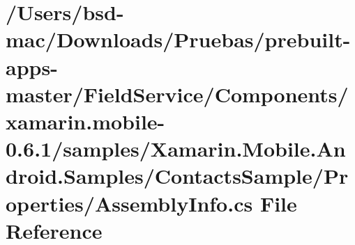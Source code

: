 \hypertarget{_components_2xamarin_8mobile-0_86_81_2samples_2_xamarin_8_mobile_8_android_8_samples_2_contacts_48fb203e3c4e4cd5cea2f2f1d747fbdd}{\section{/\+Users/bsd-\/mac/\+Downloads/\+Pruebas/prebuilt-\/apps-\/master/\+Field\+Service/\+Components/xamarin.mobile-\/0.6.1/samples/\+Xamarin.Mobile.\+Android.\+Samples/\+Contacts\+Sample/\+Properties/\+Assembly\+Info.cs File Reference}
\label{_components_2xamarin_8mobile-0_86_81_2samples_2_xamarin_8_mobile_8_android_8_samples_2_contacts_48fb203e3c4e4cd5cea2f2f1d747fbdd}
}
